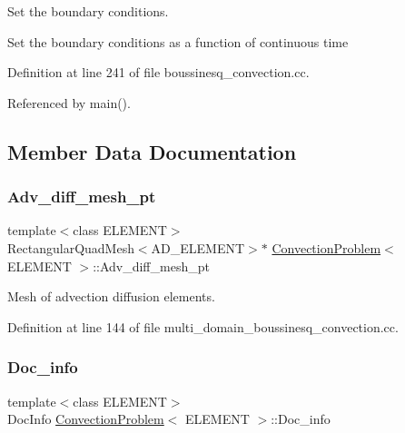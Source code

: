 Set the boundary conditions. 

Set the boundary conditions as a function of continuous time 

Definition at line 241 of file boussinesq\+\_\+convection.\+cc.



Referenced by main().



\subsection{Member Data Documentation}
\mbox{\label{classConvectionProblem_ac4dfae66888e0f70a71b10482d20bdc0}} 
\subsubsection{\texorpdfstring{Adv\+\_\+diff\+\_\+mesh\+\_\+pt}{Adv\_diff\_mesh\_pt}}
{\footnotesize\ttfamily template$<$class E\+L\+E\+M\+E\+NT$>$ \\
Rectangular\+Quad\+Mesh$<$A\+D\+\_\+\+E\+L\+E\+M\+E\+NT$>$$\ast$ \hyperlink{classConvectionProblem}{Convection\+Problem}$<$ E\+L\+E\+M\+E\+NT $>$\+::Adv\+\_\+diff\+\_\+mesh\+\_\+pt\hspace{0.3cm}{\ttfamily [protected]}}



Mesh of advection diffusion elements. 



Definition at line 144 of file multi\+\_\+domain\+\_\+boussinesq\+\_\+convection.\+cc.

\mbox{\label{classConvectionProblem_afc3f74343209527c9d30b5207d19983d}} 
\subsubsection{\texorpdfstring{Doc\+\_\+info}{Doc\_info}}
{\footnotesize\ttfamily template$<$class E\+L\+E\+M\+E\+NT$>$ \\
Doc\+Info \hyperlink{classConvectionProblem}{Convection\+Problem}$<$ E\+L\+E\+M\+E\+NT $>$\+::Doc\+\_\+info\hspace{0.3cm}{\ttfamily [private]}}



